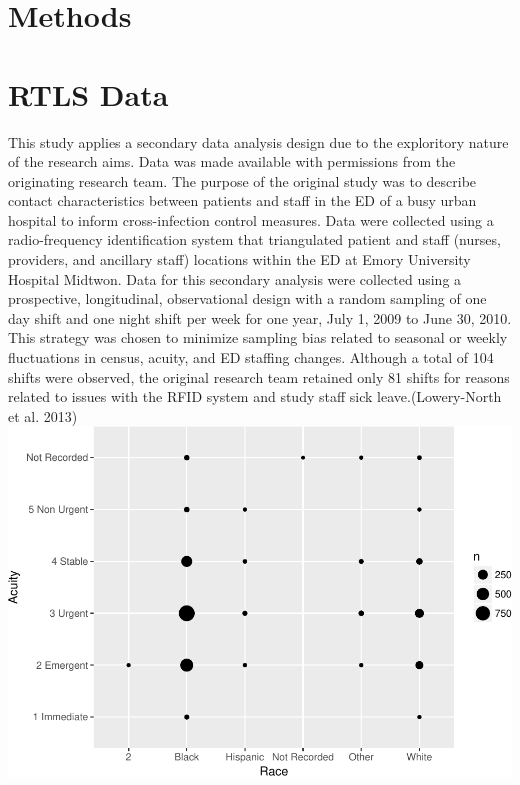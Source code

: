 \documentclass[]{elsarticle} %
\makeatletter
\def\maxwidth{\ifdim\Gin@nat@width>\linewidth\linewidth
\else\Gin@nat@width\fi}
\let\Oldincludegraphics\includegraphics
\renewcommand{\includegraphics}[1]{\Oldincludegraphics[width=\maxwidth]{#1}}
\makeatother
\begin{document}
\section{Methods}\label{methods}

\section{RTLS Data}\label{rtls-data}

This study applies a secondary data analysis design due to the
exploritory nature of the research aims. Data was made available with
permissions from the originating research team. The purpose of the
original study was to describe contact characteristics between patients
and staff in the ED of a busy urban hospital to inform cross-infection
control measures. Data were collected using a radio-frequency
identification system that triangulated patient and staff (nurses,
providers, and ancillary staff) locations within the ED at Emory
University Hospital Midtwon. Data for this secondary analysis were
collected using a prospective, longitudinal, observational design with a
random sampling of one day shift and one night shift per week for one
year, July 1, 2009 to June 30, 2010. This strategy was chosen to
minimize sampling bias related to seasonal or weekly fluctuations in
census, acuity, and ED staffing changes. Although a total of 104 shifts
were observed, the original research team retained only 81 shifts for
reasons related to issues with the RFID system and study staff sick
leave.(Lowery-North et al. 2013)
\includegraphics{Flynn_Project_files/figure-latex/assign datasets-1.pdf}
\end{document}
